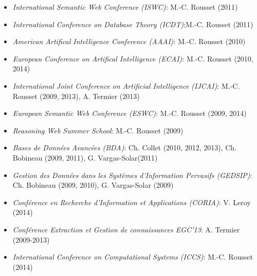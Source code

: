 \begin{itemize}
\item {\it International Semantic Web Conference (ISWC)}: M.-C. Rousset (2011)

\item {\it International Conference on Database Theory (ICDT)}:M.-C. Rousset (2011)

\item {\it American Artifical Intelligence Conference (AAAI)}: M.-C. Rousset (2010)

\item {\it European Conference on Artifical Intelligence (ECAI)}: M.-C. Rousset (2010, 2014)

\item {\it International Joint Conference on Artificial Intelligence (IJCAI)}: M.-C. Rousset (2009, 2013), A. Termier (2013)

\item {\it European Semantic Web Conference (ESWC)}: M.-C. Rousset (2009, 2014)

\item {\it Reasoning Web Summer School}: M.-C. Rousset (2009)

\item {\it Bases de Donn{\'e}es Avanc{\'e}es (BDA)}:  Ch. Collet (2010, 2012, 2013), Ch. Bobineau (2009, 2011), G. Vargas-Solar(2011)

\item {\it Gestion des Donn{\'e}es dans les Syst{\`e}mes d'Information Pervasifs (GEDSIP)}: Ch. Bobineau (2009, 2010), G. Vargas-Solar (2009)

\item {\it Conf{\'e}rence en Recherche d'Information et Applications (CORIA)}: V. Leroy (2014)

\item {\it Conf{\'e}rence Extraction et Gestion de connaissances EGC'13}:  A. Termier (2009-2013) 

\item {\it International Conference on Computational Systems (ICCS)}: M.-C. Rousset (2014)
\end{itemize}

